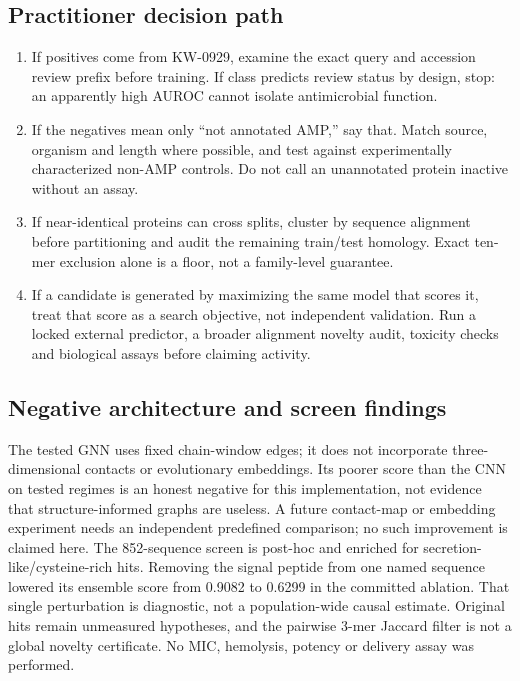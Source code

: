 \subsection*{Practitioner decision path}
\begin{enumerate}
\item If positives come from KW-0929, examine the exact query and accession review prefix before training. If class predicts review status by design, stop: an apparently high AUROC cannot isolate antimicrobial function.
\item If the negatives mean only ``not annotated AMP,'' say that. Match source, organism and length where possible, and test against experimentally characterized non-AMP controls. Do not call an unannotated protein inactive without an assay.
\item If near-identical proteins can cross splits, cluster by sequence alignment before partitioning and audit the remaining train/test homology. Exact ten-mer exclusion alone is a floor, not a family-level guarantee.
\item If a candidate is generated by maximizing the same model that scores it, treat that score as a search objective, not independent validation. Run a locked external predictor, a broader alignment novelty audit, toxicity checks and biological assays before claiming activity.
\end{enumerate}

\subsection*{Negative architecture and screen findings}
The tested GNN uses fixed chain-window edges; it does not incorporate three-dimensional contacts or evolutionary embeddings. Its poorer score than the CNN on tested regimes is an honest negative for this implementation, not evidence that structure-informed graphs are useless. A future contact-map or embedding experiment needs an independent predefined comparison; no such improvement is claimed here. The 852-sequence screen is post-hoc and enriched for secretion-like/cysteine-rich hits. Removing the signal peptide from one named sequence lowered its ensemble score from 0.9082 to 0.6299 in the committed ablation. That single perturbation is diagnostic, not a population-wide causal estimate. Original hits remain unmeasured hypotheses, and the pairwise 3-mer Jaccard filter is not a global novelty certificate. No MIC, hemolysis, potency or delivery assay was performed.

